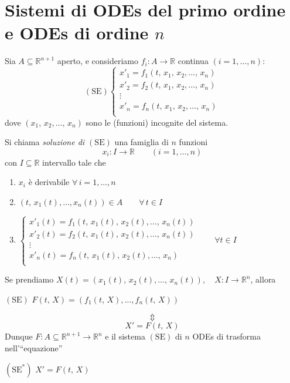 \section{Sistemi di ODEs del primo ordine e ODEs di ordine $n$}
Sia $A \subseteq \mathbb{R}^{n+1}$ aperto, e consideriamo $f_i : A \longrightarrow \mathbb{R}$ continua $(i=1,\ldots,n)$:
$$
\mathrm{(SE)}
\begin{cases}
x'_{1} = f_{1} (t,\,x_1,\,x_2,\ldots,\,x_n)\\
x'_{2} = f_{2} (t,\,x_1,\,x_2,\ldots,\,x_n)\\
\vdots\\
x'_{n} = f_{n} (t,\,x_1,\,x_2,\ldots,\,x_n)\\
\end{cases}
$$
dove $(x_1,\,x_2,\ldots,\,x_n)$ sono le (funzioni) incognite del sistema.

\begin{definition}
Si chiama \emph{soluzione di $\mathrm{(SE)}$} una famiglia di $n$ funzioni
$$
x_i : I \longrightarrow \mathbb{R} \qquad (i=1,\ldots,n)
$$
con $I \subseteq \mathbb{R}$ intervallo tale che
\begin{enumerate}[labelindent=\parindent,leftmargin=*,label=\textnormal{(\roman*)},start=1]
\item $x_i$ è derivabile $\forall \, i=1,\ldots,n$
\item $(t,\,x_1(t),\ldots,x_n(t)) \in A \qquad \forall \, t \in I$
\item $
\begin{cases}
x'_{1}(t) = f_{1} (t,\,x_1(t),\,x_2(t),\ldots,\,x_n(t))\\
x'_{2}(t) = f_{2} (t,\,x_1(t),\,x_2(t),\ldots,\,x_n(t))\\
\vdots\\
x'_{n}(t) = f_{n} (t,\,x_1(t),\,x_2(t),\ldots,\,x_n)\\
\end{cases}
\qquad \forall t \in I
$
\end{enumerate}
\end{definition}

Se prendiamo $X(t) = (x_1(t),\,x_2(t),\ldots,\,x_n(t)), \quad X : I \longrightarrow \mathbb{R}^n$, allora
\begin{center}
$\mathrm{(SE)}$
\hfill
$\displaystyle
F(t,\,X) = \left( f_1(t,\,X),\ldots,f_n(t,\,X) \right)
$
\hfill \null \\
\end{center}
$$
\Updownarrow
$$
$$
X' = F(t,\,X)
$$
Dunque $F : A \subseteq \mathbb{R}^{n+1} \longrightarrow \mathbb{R}^n$ e il sistema $\mathrm{(SE)}$ di $n$ ODEs di trasforma nell'``equazione''
\begin{center}
$\mathrm{(SE^*)}$
\hfill
$\displaystyle
X' = F(t,\,X)
$
\hfill \null \\
\end{center}

